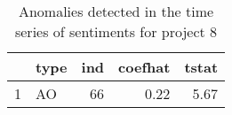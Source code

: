 % 
\begin{table}
\centering
\caption{Anomalies detected in the time series of sentiments for project 8}
\begin{tabular}{rlrrr}
  \hline
 & type & ind & coefhat & tstat \\ 
  \hline
1 & AO &  66 & 0.22 & 5.67 \\ 
   \hline
\end{tabular}
\end{table}